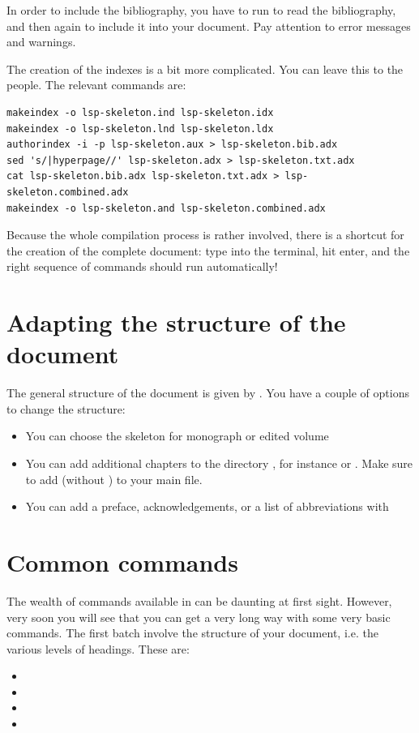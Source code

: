 In order to include the bibliography, you have to run  to read the bibliography, and then again  to include it into your document. Pay attention to error messages and warnings.

The creation of the indexes is a bit more complicated. You can leave this to the \lsp people. The relevant commands are:

\begin{verbatim}
makeindex -o lsp-skeleton.ind lsp-skeleton.idx
makeindex -o lsp-skeleton.lnd lsp-skeleton.ldx 
authorindex -i -p lsp-skeleton.aux > lsp-skeleton.bib.adx
sed 's/|hyperpage//' lsp-skeleton.adx > lsp-skeleton.txt.adx 
cat lsp-skeleton.bib.adx lsp-skeleton.txt.adx > lsp-skeleton.combined.adx 
makeindex -o lsp-skeleton.and lsp-skeleton.combined.adx
\end{verbatim}

Because the whole compilation process is rather involved, there is a shortcut for the creation of the complete document: type  into the terminal, hit enter, and the right sequence of commands should run automatically!



\section{Adapting the structure of the document}
The general structure of the document is given by \lsp. You have a couple of options to change the structure:
\begin{itemize}
 \item You can choose the skeleton for monograph or edited volume
 \item You can add additional chapters to the directory , for instance  or . Make sure to add  (without ) to your main file.
 \item You can add a preface, acknowledgements, or a list of abbreviations with 
\end{itemize}



\section{Common commands}\label{sec:latex:commoncommands}
The wealth of commands available in \latex can be daunting at first sight. However, very soon you will see that you can get a very long way with some very basic commands. The first batch involve the structure of your document, i.e. the various levels of headings. These are:
\begin{itemize}
 \item {}
\item {}
\item {}
\item {}
\end{itemize}

